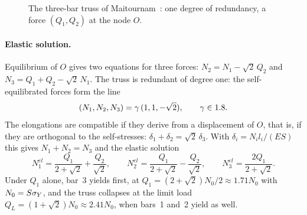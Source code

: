 \begin{figure}[h]
\centering
{}
\caption{The three-bar truss of Maitournam~\cite{Maitournam2012c}: one degree of
redundancy, a force $(Q_1,Q_2)$ at the node $O$.}
\label{fig:cy-truss}
\end{figure}

\paragraph{Elastic solution.}
Equilibrium of $O$ gives two equations for three forces:
$N_2=N_1-\sqrt2\,Q_2$ and $N_3=Q_1+Q_2-\sqrt2\,N_1$. The truss is redundant of
degree one: the self-equilibrated forces form the line
\begin{equation}\label{eq:cy-truss-self}
  (N_1,N_2,N_3)=\gamma\,(1,1,-\sqrt2),\qquad \gamma\in1.8 .
\end{equation}
The elongations are compatible if they derive from a displacement of $O$,
that is, if they are orthogonal to the self-stresses:
$\delta_1+\delta_2=\sqrt2\,\delta_3$. With $\delta_i=N_il_i/(ES)$ this gives
$N_1+N_2=N_3$ and the elastic solution~\cite[eq.~(3.46)]{Maitournam2012c}
\begin{equation}\label{eq:cy-truss-el}
  N^{el}_1=\frac{Q_1}{2+\sqrt2}+\frac{Q_2}{\sqrt2},\qquad
  N^{el}_2=\frac{Q_1}{2+\sqrt2}-\frac{Q_2}{\sqrt2},\qquad
  N^{el}_3=\frac{2Q_1}{2+\sqrt2}.
\end{equation}
Under $Q_1$ alone, bar~3 yields first, at $Q_1=(2+\sqrt2)N_0/2\approx1.71N_0$
with $N_0=S\sigma_{Y}$, and the truss collapses at the limit load
$Q_L=(1+\sqrt2)N_0\approx2.41N_0$, when bars~1 and~2 yield as well.

